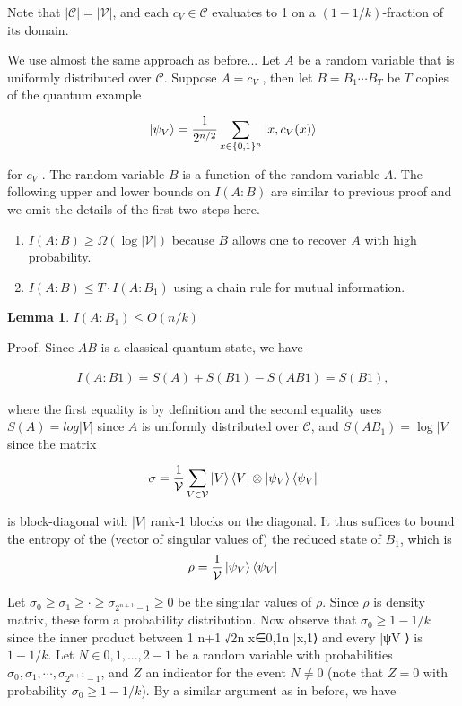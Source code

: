 \documentclass[12]{amsart}
\newcommand\0{\mathbf{0}}
\newcommand\<{\langle}
\renewcommand\>{\rangle}
\newtheorem{lemma}[theorem]{Lemma}
\begin{document}
Note that $|\mathcal{C}| = |\mathcal{V}|$, and each $c_V \in \mathcal{C}$ evaluates to 1 on a $(1-1/k)$-fraction of its domain.

We use almost the same approach as before... Let
$A$ be a random variable that is uniformly distributed over $\mathcal{C}$. Suppose $A = c_V$ , then let $B = B_1 \cdots B_T$ be $T$ copies of the quantum example 

$$\ket{\psi_V} = \frac{1}{2^{n/2}}\sum_{x \in \{0,1\}^n} \ket{x, c_V(x)} $$

for $c_V$ . The random variable $B$ is a function of the random variable $A$. The following upper and lower bounds on $I(A : B)$ are
  similar to previous proof and we omit the details of the first two steps here. 
  
\begin{enumerate}
\item $I(A:B) \geq \Omega(\log|\mathcal{V}|)$ because $B$ allows one to recover $A$ with high probability.	
\item $I(A:B)\leq T\cdot I(A:B_1)$ using a chain rule for mutual information.
\end{enumerate}

\begin{lemma}
$I(A : B_1) \leq O(n/k)$	
\end{lemma}

Proof. Since $AB$ is a classical-quantum state, we have

\begin{align*}
I(A : B1) = S(A) + S(B1) − S(AB1) = S(B1),	
\end{align*}


where the first equality is by definition and the second equality uses $S(A) = log|V|$ since $A$ is uniformly distributed over $\mathcal{C}$, and $S(AB_1) = \log|V|$ since the matrix 

$$
\sigma = \frac{1}{\mathcal{V}}\sum_{V \in \mathcal{V}}\ket{V}\bra{V} \otimes \ket{\psi_V}\bra{\psi_V}
$$

is block-diagonal with $|V|$ rank-1 blocks on the diagonal. It thus suffices to bound the entropy
of the (vector of singular values of) the reduced state of $B_1$, which is 
$$
\rho = \frac{1}{\mathcal{V}}\ket{\psi_V}\bra{\psi_V}
$$
 
Let $\sigma_0 \geq \sigma_1 \geq \cdot \geq \sigma_{2^{n+1}-1}\geq 0$ be the singular values of $\rho$. Since $\rho$ is density matrix, these form a probability distribution. Now observe that $\sigma_0 \geq 1 - 1/k$ since the inner product between 1 n+1
√2n x∈{0,1}n |x,1⟩ and every |ψV ⟩ is$ 1 - 1/k$. Let $N \in {0,1,...,2 − 1}$ be a random variable with probabilities $\sigma_0, \sigma_1, \cdots, \sigma_{2^{n+1}-1}$, and $Z$ an indicator for the event $N \neq 0$ (note that $Z = 0$ with probability $\sigma_0 \geq 1 - 1/k$). By a similar argument as in before, we have 
\end{document}
